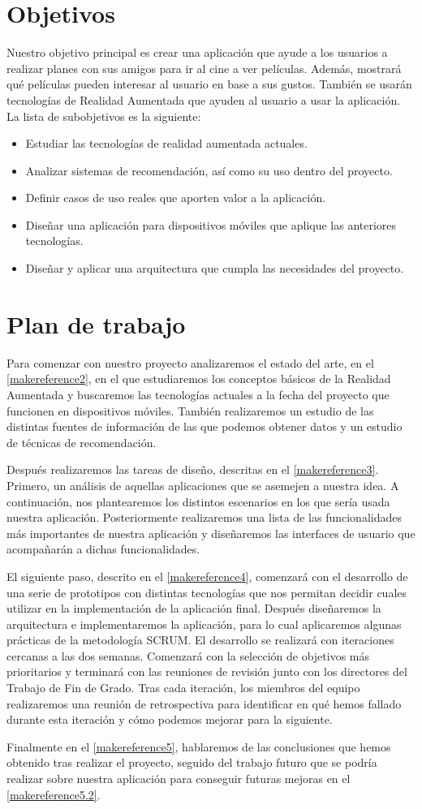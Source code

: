 \section{Objetivos}
\label{makereference1.2}
Nuestro objetivo principal es crear una aplicación que ayude a los usuarios a
realizar planes con sus amigos para ir al cine a ver películas. Además,
mostrará qué películas pueden interesar al usuario en base a sus gustos.
También se usarán tecnologías de Realidad Aumentada que ayuden al usuario a usar
la aplicación.
La lista de subobjetivos es la siguiente:
\begin{itemize}  
    \item Estudiar las tecnologías de realidad aumentada actuales.
    \item Analizar sistemas de recomendación, así como su uso dentro del
     proyecto.
    \item Definir casos de uso reales que aporten valor a la aplicación.
    \item Diseñar una aplicación para dispositivos móviles que aplique las
     anteriores tecnologías.
    \item Diseñar y aplicar una arquitectura que cumpla las necesidades del
     proyecto.
\end{itemize}

\section{Plan de trabajo}
\label{makereference1.3}

Para comenzar con nuestro proyecto analizaremos el estado del arte, en el
 \autoref{makereference2}, en el que estudiaremos los conceptos básicos de la
 Realidad Aumentada y buscaremos las tecnologías actuales a la fecha del proyecto
 que funcionen en dispositivos móviles. También realizaremos un estudio de las distintas
 fuentes de información de las que podemos obtener datos y un estudio de
 técnicas de recomendación.

Después realizaremos las tareas de diseño, descritas en el
 \autoref{makereference3}. Primero, un análisis de aquellas aplicaciones que se
 asemejen a nuestra idea. A continuación, nos plantearemos los distintos
 escenarios en los que sería usada nuestra aplicación. Posteriormente
 realizaremos una lista de las funcionalidades más importantes de nuestra
 aplicación y diseñaremos las interfaces de usuario que acompañarán a dichas
 funcionalidades. 
   
El siguiente paso, descrito en el \autoref{makereference4}, comenzará con
 el desarrollo de una serie de prototipos con distintas tecnologías que nos permitan
 decidir cuales utilizar en la implementación de la aplicación final. Después diseñaremos la
 arquitectura e implementaremos la aplicación, para lo cual aplicaremos algunas
 prácticas de la metodología SCRUM. El desarrollo se realizará con iteraciones
 cercanas a las dos semanas. Comenzará con la selección de objetivos más
 prioritarios y terminará con las reuniones de revisión junto con los directores
 del Trabajo de Fin de Grado. Tras cada iteración, los miembros del equipo
 realizaremos una reunión de retrospectiva para identificar en qué hemos fallado
 durante esta iteración y cómo podemos mejorar para la siguiente.

Finalmente en el \autoref{makereference5}, hablaremos de las conclusiones que
 hemos obtenido tras realizar el proyecto, seguido del trabajo futuro que se podría realizar sobre nuestra
 aplicación para conseguir futuras mejoras en el \autoref{makereference5.2}.
